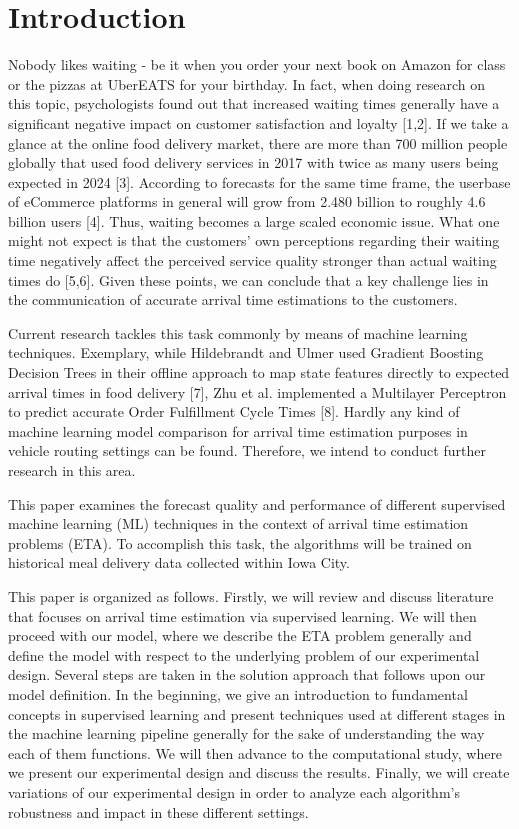 \chapter{Introduction}

Nobody likes waiting - be it when you order your next book on Amazon for class or the pizzas at UberEATS for your birthday. In fact, when doing research on this topic, psychologists found out that increased waiting times generally have a significant negative impact on customer satisfaction and loyalty [1,2]. If we take a glance at the online food delivery market, there are more than 700 million people globally that used food delivery services in 2017 with twice as many users being expected in 2024 [3]. According to forecasts for the same time frame, the userbase of eCommerce platforms in general will grow from 2.480 billion to roughly 4.6 billion users [4]. Thus, waiting becomes a large scaled economic issue. What one might not expect is that the customers’ own perceptions regarding their waiting time negatively affect the perceived service quality stronger than actual waiting times do [5,6]. Given these points, we can conclude that a key challenge lies in the communication of accurate arrival time estimations to the customers. 

Current research tackles this task commonly by means of machine learning techniques. Exemplary, while Hildebrandt and Ulmer used Gradient Boosting Decision Trees in their offline approach to map state features directly to expected arrival times in food delivery [7], Zhu et al. implemented a Multilayer Perceptron to predict accurate Order Fulfillment Cycle Times [8]. Hardly any kind of machine learning model comparison for arrival time estimation purposes in vehicle routing settings can be found. Therefore, we intend to conduct further research in this area.  

This paper examines the forecast quality and performance of different supervised machine learning (ML) techniques in the context of arrival time estimation problems (ETA). To accomplish this task, the algorithms will be trained on historical meal delivery data collected within Iowa City. 

This paper is organized as follows. Firstly, we will review and discuss literature that focuses on arrival time estimation via supervised learning. We will then proceed with our model, where we describe the ETA problem generally and define the model with respect to the underlying problem of our experimental design. Several steps are taken in the solution approach that follows upon our model definition. In the beginning, we give an introduction to fundamental concepts in supervised learning and present techniques used at different stages in the machine learning pipeline generally for the sake of understanding the way each of them functions. We will then advance to the computational study, where we present our experimental design and discuss the results. Finally, we will create variations of our experimental design in order to analyze each algorithm’s robustness and impact in these different settings.